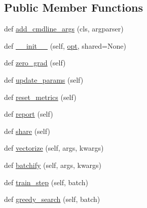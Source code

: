 \subsection*{Public Member Functions}
\begin{DoxyCompactItemize}
\item 
def \hyperlink{classparlai_1_1agents_1_1legacy__agents_1_1seq2seq_1_1seq2seq__v1_1_1Seq2seqAgent_a2f5c66732d78976428b26b96f14b311b}{add\+\_\+cmdline\+\_\+args} (cls, argparser)
\item 
def \hyperlink{classparlai_1_1agents_1_1legacy__agents_1_1seq2seq_1_1seq2seq__v1_1_1Seq2seqAgent_aea5753e8b1090fc88e657ada44492556}{\+\_\+\+\_\+init\+\_\+\+\_\+} (self, \hyperlink{classparlai_1_1agents_1_1legacy__agents_1_1seq2seq_1_1torch__agent__v1_1_1TorchAgent_a4e938a91873bd6edde0ac7ed5299bc6a}{opt}, shared=None)
\item 
def \hyperlink{classparlai_1_1agents_1_1legacy__agents_1_1seq2seq_1_1seq2seq__v1_1_1Seq2seqAgent_af2e9c4d06f55802308dbfedfea69d0cd}{zero\+\_\+grad} (self)
\item 
def \hyperlink{classparlai_1_1agents_1_1legacy__agents_1_1seq2seq_1_1seq2seq__v1_1_1Seq2seqAgent_a3fabaacec11534b452a1786d3dd5a6c8}{update\+\_\+params} (self)
\item 
def \hyperlink{classparlai_1_1agents_1_1legacy__agents_1_1seq2seq_1_1seq2seq__v1_1_1Seq2seqAgent_a521db011d2188e8e513976af5737c322}{reset\+\_\+metrics} (self)
\item 
def \hyperlink{classparlai_1_1agents_1_1legacy__agents_1_1seq2seq_1_1seq2seq__v1_1_1Seq2seqAgent_ae588ce85bae56791bac9dd744e5414ce}{report} (self)
\item 
def \hyperlink{classparlai_1_1agents_1_1legacy__agents_1_1seq2seq_1_1seq2seq__v1_1_1Seq2seqAgent_afb99f50cbac1707480d1953163d91018}{share} (self)
\item 
def \hyperlink{classparlai_1_1agents_1_1legacy__agents_1_1seq2seq_1_1seq2seq__v1_1_1Seq2seqAgent_ae0e5663a7879b2704378dfe99ef6d0f4}{vectorize} (self, args, kwargs)
\item 
def \hyperlink{classparlai_1_1agents_1_1legacy__agents_1_1seq2seq_1_1seq2seq__v1_1_1Seq2seqAgent_abb81dee41215c5d402fef970b0bf1931}{batchify} (self, args, kwargs)
\item 
def \hyperlink{classparlai_1_1agents_1_1legacy__agents_1_1seq2seq_1_1seq2seq__v1_1_1Seq2seqAgent_a59a524e15577396e60a1e5f8b6bfe9a7}{train\+\_\+step} (self, batch)
\item 
def \hyperlink{classparlai_1_1agents_1_1legacy__agents_1_1seq2seq_1_1seq2seq__v1_1_1Seq2seqAgent_a6afc143cc0ec59803be416416ce1ec97}{greedy\+\_\+search} (self, batch)

\end{DoxyCompactItemize}
